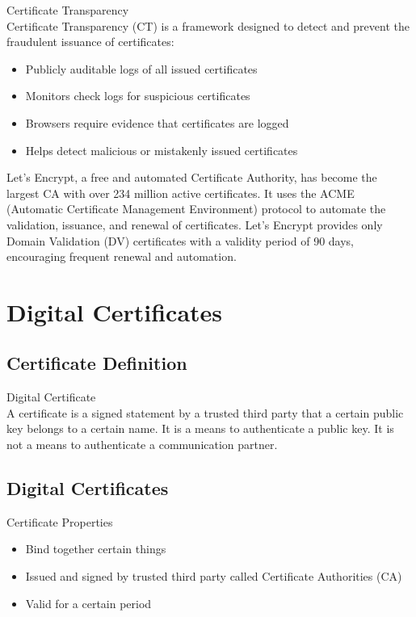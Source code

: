 \begin{concept}{Certificate Transparency}\\
Certificate Transparency (CT) is a framework designed to detect and prevent the fraudulent issuance of certificates:
\begin{itemize}
    \item Publicly auditable logs of all issued certificates
    \item Monitors check logs for suspicious certificates
    \item Browsers require evidence that certificates are logged
    \item Helps detect malicious or mistakenly issued certificates
\end{itemize}
\end{concept}

\begin{example}
Let's Encrypt, a free and automated Certificate Authority, has become the largest CA with over 234 million active certificates. It uses the ACME (Automatic Certificate Management Environment) protocol to automate the validation, issuance, and renewal of certificates. Let's Encrypt provides only Domain Validation (DV) certificates with a validity period of 90 days, encouraging frequent renewal and automation.
\end{example}

\section{Digital Certificates}

\subsection{Certificate Definition}

\begin{definition}{Digital Certificate}\\
    A certificate is a signed statement by a trusted third party that a certain public key belongs to a certain name. It is a means to authenticate a public key. It is not a means to authenticate a communication partner.
\end{definition}

\subsection{Digital Certificates}

\begin{concept}{Certificate Properties}\\
    \begin{itemize}
        \item Bind together certain things
        \item Issued and signed by trusted third party called Certificate Authorities (CA)
        \item Valid for a certain period
    \end{itemize}
\end{concept}

